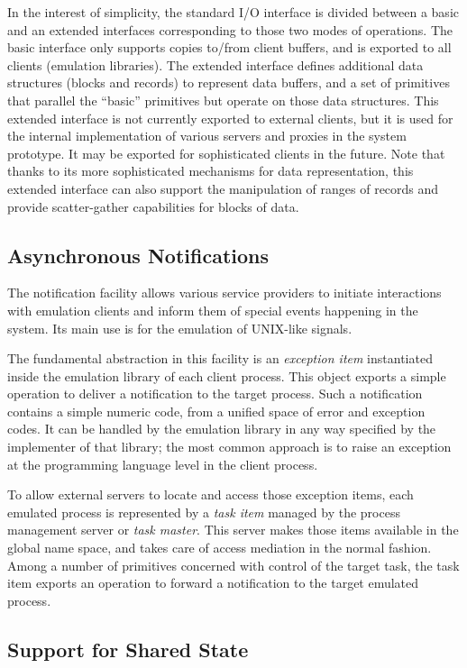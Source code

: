 In the interest of simplicity, the standard I/O interface is divided
between a basic and an extended interfaces corresponding to those two
modes of operations. The basic interface only supports copies to/from
client buffers, and is exported to all clients (emulation libraries).
The extended interface defines additional data structures (blocks and
records) to represent data buffers, and a set of primitives that
parallel the ``basic'' primitives but operate on those data
structures. This extended interface is not currently exported to
external clients, but it is used for the internal implementation of
various servers and proxies in the system prototype. It may be
exported for sophisticated clients in the future. Note that thanks to
its more sophisticated mechanisms for data representation, this
extended interface can also support the manipulation of ranges of
records and provide scatter-gather capabilities for blocks of data.

\subsection{Asynchronous Notifications}

The notification facility allows various service providers to initiate
interactions with emulation clients and inform them of special events
happening in the system. Its main use is for the emulation of
UNIX-like signals.

The fundamental abstraction in this facility is an {\em exception
item} instantiated inside the emulation library of each client process.
This object exports a simple operation to deliver a notification to
the target process. Such a notification contains a simple numeric
code, from a unified space of error and exception codes. It can be
handled by the emulation library in any way specified by the
implementer of that library; the most common approach is to raise an
exception at the programming language level in the client process.

To allow external servers to locate and access those exception items,
each emulated process is represented by a {\em task item} managed by
the process management server or {\em task master}. This server makes
those items available in the global name space, and takes care of
access mediation in the normal fashion. Among a number of primitives
concerned with control of the target task, the task item exports an
operation to forward a notification to the target emulated process.

\subsection{Support for Shared State}

